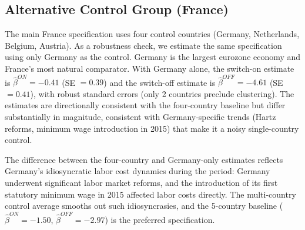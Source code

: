 \documentclass[12pt]{article}
\begin{document}
\subsection{Alternative Control Group (France)}

The main France specification uses four control countries (Germany, Netherlands, Belgium, Austria). As a robustness check, we estimate the same specification using only Germany as the control. Germany is the largest eurozone economy and France's most natural comparator. With Germany alone, the switch-on estimate is $\hat{\beta}^{ON} = -0.41$ (SE $= 0.39$) and the switch-off estimate is $\hat{\beta}^{OFF} = -4.61$ (SE $= 0.41$), with robust standard errors (only 2 countries preclude clustering). The estimates are directionally consistent with the four-country baseline but differ substantially in magnitude, consistent with Germany-specific trends (Hartz reforms, minimum wage introduction in 2015) that make it a noisy single-country control.

The difference between the four-country and Germany-only estimates reflects Germany's idiosyncratic labor cost dynamics during the period: Germany underwent significant labor market reforms, and the introduction of its first statutory minimum wage in 2015 affected labor costs directly. The multi-country control average smooths out such idiosyncrasies, and the 5-country baseline ($\hat{\beta}^{ON} = -1.50$, $\hat{\beta}^{OFF} = -2.97$) is the preferred specification.
\end{document}
